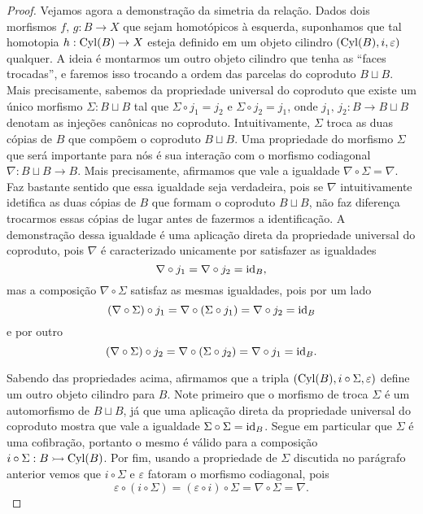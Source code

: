 \begin{proof}
  Vejamos agora a demonstração da simetria da relação.
  Dados dois morfismos $f,\,g: B \to X$ que sejam homotópicos à esquerda, suponhamos que tal homotopia $h: \mathrm{Cyl}(B) \to X$ esteja definido em um objeto cilindro $(\mathrm{Cyl}(B),i,\varepsilon)$ qualquer.
  A ideia é montarmos um outro objeto cilindro que tenha as ``faces trocadas'', e faremos isso trocando a ordem das parcelas do coproduto $B \sqcup B$.
  Mais precisamente, sabemos da propriedade universal do coproduto que existe um único morfismo $\Sigma: B \sqcup B$ tal que $\Sigma \circ j_{1} = j_{2}$ e $\Sigma \circ j_{2} = j_{1}$, onde $j_{1},\, j_{2}: B \to B \sqcup B$ denotam as injeções canônicas no coproduto.
  Intuitivamente, $\Sigma$ troca as duas cópias de $B$ que compõem o coproduto $B \sqcup B$.
  Uma propriedade do morfismo $\Sigma$ que será importante para nós é sua interação com o morfismo codiagonal $\nabla: B \sqcup B \to B$.
  Mais precisamente, afirmamos que vale a igualdade $\nabla \circ \Sigma = \nabla$.
  Faz bastante sentido que essa igualdade seja verdadeira, pois se $\nabla$ intuitivamente idetifica as duas cópias de $B$ que formam o coproduto $B \sqcup B$, não faz diferença trocarmos essas cópias de lugar antes de fazermos a identificação.
  A demonstração dessa igualdade é uma aplicação direta da propriedade universal do coproduto, pois $\nabla$ é caracterizado unicamente por satisfazer as igualdades
  \begin{displaymath}
    \nabla \circ j_{1} = \nabla \circ j_{2} = \mathrm{id}_{B},
  \end{displaymath}
  mas a composição $\nabla \circ \Sigma$ satisfaz as mesmas igualdades, pois por um lado
  \begin{displaymath}
    (\nabla \circ \Sigma) \circ j_{1} = \nabla \circ (\Sigma \circ j_{1}) = \nabla \circ j_{2} = \mathrm{id}_{B}
  \end{displaymath}
  e por outro
  \begin{displaymath}
    (\nabla \circ \Sigma) \circ j_{2} = \nabla \circ (\Sigma \circ j_{2}) = \nabla \circ j_{1} = \mathrm{id}_{B}.
  \end{displaymath}

  Sabendo das propriedades acima, afirmamos que a tripla $(\mathrm{Cyl}(B),i \circ \Sigma,\varepsilon)$ define um outro objeto cilindro para $B$.
  Note primeiro que o morfismo de troca $\Sigma$ é um automorfismo de $B \sqcup B$, já que uma aplicação direta da propriedade universal do coproduto mostra que vale a igualdade $\Sigma \circ \Sigma = \mathrm{id}_{B}$.
  Segue em particular que $\Sigma$ é uma cofibração, portanto o mesmo é válido para a composição $i \circ \Sigma: B \rightarrowtail \mathrm{Cyl}(B)$.
  Por fim, usando a propriedade de $\Sigma$ discutida no parágrafo anterior vemos que $i \circ \Sigma$ e $\varepsilon$ fatoram o morfismo codiagonal, pois
  \begin{displaymath}
    \varepsilon \circ (i \circ \Sigma) = (\varepsilon \circ i) \circ \Sigma = \nabla \circ \Sigma = \nabla.
  \end{displaymath}
  

\end{proof}
